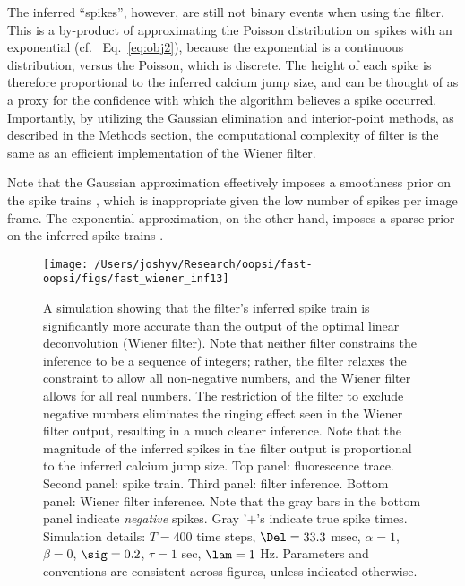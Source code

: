 The inferred ``spikes'', however, are still not binary events when using the \foopsi filter.  This is a by-product of approximating the Poisson distribution on spikes with an exponential (cf.~ Eq.~\eqref{eq:obj2}), because the exponential is a continuous distribution, versus the Poisson, which is discrete.  The height of each spike is therefore proportional to the inferred calcium jump size, and can be thought of as a proxy for the confidence with which the algorithm believes a spike occurred.   Importantly, by utilizing the Gaussian elimination and interior-point methods, as described in the Methods section, the computational complexity of \foopsi filter is the same as an efficient implementation of the Wiener filter.  

Note that the Gaussian approximation effectively imposes a smoothness prior on the spike trains \cite{WuGallant06}, which is inappropriate given the low number of spikes per image frame.  The exponential approximation, on the other hand, imposes a sparse prior on the inferred spike trains \cite{Seeger08}.  



\begin{figure}[h!]
\centering \texttt{[image: /Users/joshyv/Research/oopsi/fast-oopsi/figs/fast\_wiener\_inf13]}
\caption[\foopsi filter outperforms Wiener filter]{A simulation showing that the \foopsi filter's inferred spike train is significantly more accurate than the output of the optimal linear deconvolution (Wiener filter). Note that neither filter constrains the inference to be a sequence of integers; rather, the \foopsi filter relaxes the constraint to allow all non-negative numbers, and the Wiener filter allows for all real numbers.  The restriction of the \foopsi filter to exclude negative numbers eliminates the ringing effect seen in the Wiener filter output, resulting in a much cleaner inference.  Note that the magnitude of the inferred spikes in the \foopsi filter output is proportional to the inferred calcium jump size.  Top panel: fluorescence trace.  Second panel: spike train.  Third panel: \foopsi filter inference.  Bottom panel: Wiener filter inference.  Note that the gray bars in the bottom panel indicate \emph{negative} spikes. Gray '$+$'s indicate true spike times.  Simulation details: $T= 400$ time steps, $\Del=33.3$ msec, $\alpha=1$, $\beta=0$, $\sig=0.2$, $\tau=1$ sec, $\lam=1$ Hz. Parameters and conventions are consistent across figures, unless indicated otherwise.} \label{fig:woopsi_inf}
\end{figure}

